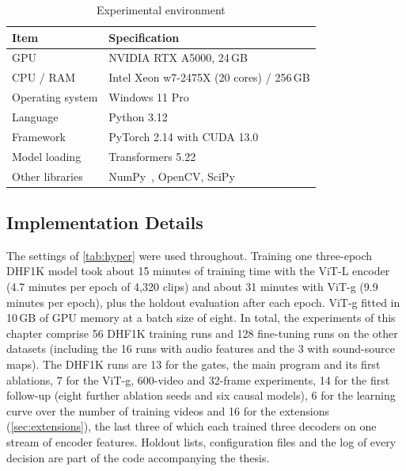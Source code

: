 \begin{table}[htbp]
  \centering
  \caption{Experimental environment}\label{tab:setup}
  \begin{tabular}{@{}ll@{}}
    \toprule
    \textbf{Item} & \textbf{Specification} \\
    \midrule
    \acrfull{GPU}            & NVIDIA RTX A5000, 24\,GB \\
    \acrshort{CPU} / \acrshort{RAM}           & Intel Xeon w7-2475X (20 cores) / 256\,GB \\
    Operating system    & Windows 11 Pro \\
    Language            & Python 3.12 \\
    Framework           & PyTorch 2.14 with \acrshort{CUDA} 13.0~\cite{paszke2019pytorch} \\
    Model loading       & Transformers 5.22~\cite{wolf2020transformers} \\
    Other libraries     & NumPy~\cite{harris2020array}, OpenCV, SciPy \\
    \bottomrule
  \end{tabular}
\end{table}

\subsection{Implementation Details}

The settings of \cref{tab:hyper} were used throughout. Training one
three-epoch DHF1K model took about 15 minutes of training time with the
\acrshort{ViT}-L encoder (4.7 minutes per epoch of 4,320 clips) and about 31 minutes with
\acrshort{ViT}-g (9.9 minutes per epoch), plus the holdout evaluation after each epoch.
\acrshort{ViT}-g fitted in 10\,GB of \acrshort{GPU} memory at a batch size of eight. In total, the
experiments of this chapter comprise 56 DHF1K training runs and 128
fine-tuning runs on the other datasets (including the 16 runs with audio
features and the 3 with sound-source maps).
The DHF1K runs are 13 for the gates, the main program and its first
ablations, 7 for the \acrshort{ViT}-g, 600-video and 32-frame experiments, 14
for the first follow-up (eight further ablation seeds and six causal models),
6 for the learning curve over the number of training videos and 16 for the
extensions (\cref{sec:extensions}), the last three of which each trained three
decoders on one stream of encoder features. Holdout
lists, configuration files and the log of every decision are part of the
code accompanying the thesis.

